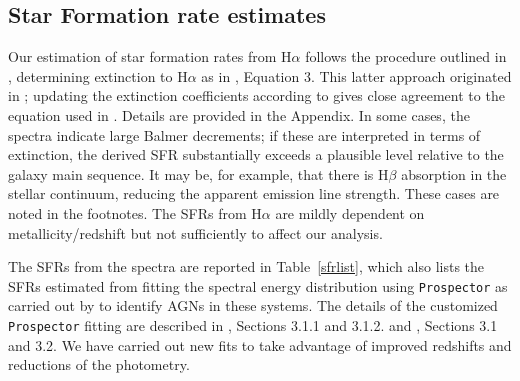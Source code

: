 \documentclass[twocolumn]{aastex63}
\begin{document}
    
\subsection{Star Formation rate estimates}

Our  estimation of star formation rates from H$\alpha$ follows the procedure outlined in \citet{Kennicutt2012}, determining extinction to H$\alpha$ as in \citet{Koyama2015}, Equation 3. This latter approach originated in \citet{Calzetti2001}; updating the extinction coefficients according to \citet{Momcheva2013} gives close agreement to the equation used in \citet{Koyama2015}. 
Details are provided in the Appendix. In some cases, the spectra indicate large Balmer decrements; if these are interpreted in terms of extinction, the derived 
SFR substantially exceeds a plausible level relative to the galaxy main sequence. It may be, for example, that there is H$\beta$ absorption in the stellar continuum, reducing the apparent emission line strength. 
These cases are noted in the footnotes. The SFRs from H$\alpha$ are mildly dependent on metallicity/redshift \citep{Backhaus2024} but not sufficiently to affect our analysis. 

The SFRs  from the spectra  are reported in Table~\ref{sfrlist}, which also lists the SFRs
estimated from fitting the spectral energy distribution using
\texttt{Prospector} \citep{Johnson2021} as carried out  by \citet{Lyu2024} to
identify AGNs in these systems.  The details of the customized
\texttt{Prospector} fitting are described in \citet{Lyu2022b}, Sections 3.1.1
and 3.1.2. and \citet{Lyu2024}, Sections 3.1 and 3.2. We have carried out new
fits to take advantage of improved redshifts and reductions of the photometry.
\end{document}

